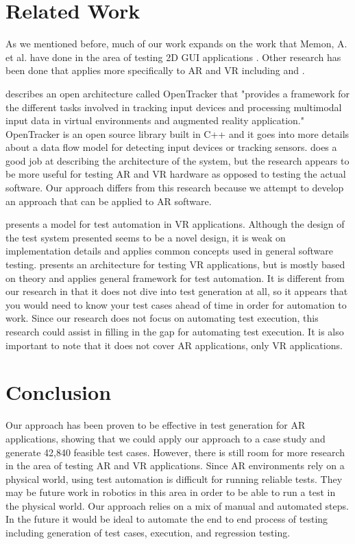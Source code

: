 \documentclass[final,3p]{CSP}
\begin{document}
\section{Related Work}
\noindent
As we mentioned before, much of our work expands on the work that Memon, A. et al. have done in the area of testing 2D GUI applications \cite{DARTFramework, GUIRip, EventFlow, framework}.  Other research has been done that applies more specifically to AR and VR including \cite{openarch} and \cite{bierbaum2003automated}.

\cite{openarch} describes an open architecture called OpenTracker that "provides a framework for the different tasks involved in tracking input devices and processing
multimodal input data in virtual environments and augmented reality application."  OpenTracker is an open source library built in C++ and \cite{openarch} it goes into more details about a data flow model for detecting input devices or tracking sensors.  \cite{openarch} does a good job at describing the architecture of the system, but the research appears to be more useful for testing AR and VR hardware as opposed to testing the actual software.  Our approach differs from this research because we attempt to develop an approach that can be applied to AR software.

\cite{bierbaum2003automated} presents a model for test automation in VR applications.  Although the design of the test system presented seems to be a novel design, it is weak on implementation details and applies common concepts used in general software testing.  \cite{bierbaum2003automated} presents an architecture for testing VR applications, but is mostly based on theory and applies general framework for test automation.  It is different from our research in that it does not dive into test generation at all, so it appears that you would need to know your test cases ahead of time in order for automation to work.  Since our research does not focus on automating test execution, this research could assist in filling in the gap for automating test execution.  It is also important to note that it does not cover AR applications, only VR applications.

\section{Conclusion}
\noindent
Our approach has been proven to be effective in test generation for AR applications, showing that we could apply our approach to a case study and generate 42,840 feasible test cases.  However, there is still room for more research in the area of testing AR and VR applications.  Since AR environments rely on a physical world, using test automation is difficult for running reliable tests.  They may be future work in robotics in this area in order to be able to run a test in the physical world.  Our approach relies on a mix of manual and automated steps.  In the future it would be ideal to automate the end to end process of testing including generation of test cases, execution, and regression testing.
\end{document}
